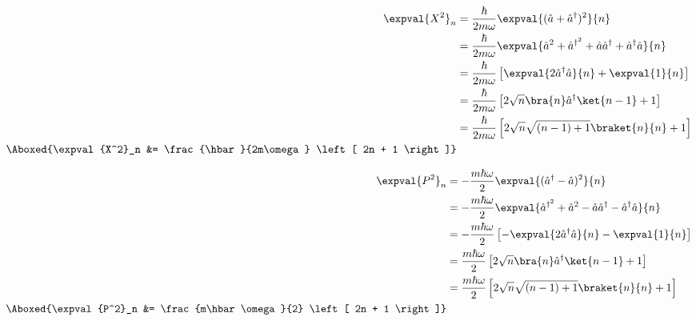 \documentclass{article}
\begin{document}
\begin{enumerate}
		\begin{minipage}{0.45\textwidth}
			\begin{equation}
				\begin{split}
					\expval{X^2}_n &= \frac{\hbar}{2m\omega} \expval{(\hat{a} + \hat{a}^\dagger)^2}{n} \\
					&= \frac{\hbar}{2m\omega} \expval{\hat{a}^2 + \hat{a}^{\dagger^2} + \hat{a}\hat{a}^\dagger + \hat{a}^\dagger\hat{a}}{n} \\
					&= \frac{\hbar}{2m\omega} \left[ \expval{2\hat{a}^\dagger\hat{a}}{n} + \expval{1}{n} \right] \\
					&= \frac{\hbar}{2m\omega} \left[ 2\sqrt{n}\bra{n}\hat{a}^\dagger\ket{n-1} + 1 \right] \\
					&= \frac{\hbar}{2m\omega} \left[ 2\sqrt{n}\sqrt{(n-1)+1}\braket{n}{n} + 1 \right] \\
					\Aboxed{\expval{X^2}_n &= \frac{\hbar}{2m\omega} \left[ 2n + 1 \right]}
				\end{split}
			\end{equation}
		\end{minipage}
		\begin{minipage}{0.45\textwidth}
			\begin{equation}
				\begin{split}
					\expval{P^2}_n &= -\frac{m\hbar\omega}{2} \expval{(\hat{a}^\dagger - \hat{a})^2}{n} \\
					&= -\frac{m\hbar\omega}{2} \expval{\hat{a}^{\dagger^2} + \hat{a}^2 - \hat{a}\hat{a}^\dagger - \hat{a}^\dagger\hat{a}}{n} \\
					&= -\frac{m\hbar\omega}{2} \left[ -\expval{2\hat{a}^\dagger\hat{a}}{n} - \expval{1}{n} \right] \\
					&= \frac{m\hbar\omega}{2} \left[ 2\sqrt{n}\bra{n}\hat{a}^\dagger\ket{n-1} + 1 \right] \\
					&= \frac{m\hbar\omega}{2} \left[ 2\sqrt{n}\sqrt{(n-1)+1}\braket{n}{n} + 1 \right] \\
					\Aboxed{\expval{P^2}_n &= \frac{m\hbar\omega}{2} \left[ 2n + 1 \right]}
				\end{split}
			\end{equation}
		\end{minipage}
		

\end{enumerate}
\end{document}
